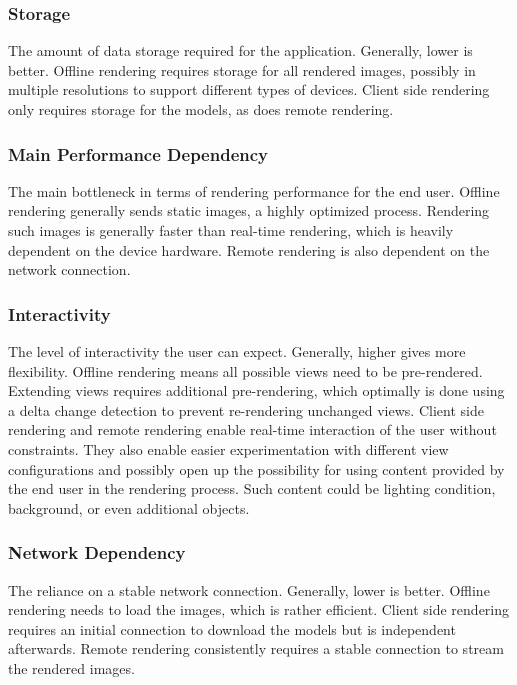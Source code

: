 \subsubsection{Storage}

The amount of data storage required for the application. Generally, lower is better. Offline rendering requires storage for all rendered images, possibly in multiple resolutions to support different types of devices. Client side rendering only requires storage for the models, as does remote rendering.

\subsubsection{Main Performance Dependency}

The main bottleneck in terms of rendering performance for the end user. Offline rendering generally sends static images, a highly optimized process. Rendering such images is generally faster than real-time rendering, which is heavily dependent on the device hardware. Remote rendering is also dependent on the network connection.

\subsubsection{Interactivity}

The level of interactivity the user can expect. Generally, higher gives more flexibility. Offline rendering means all possible views need to be pre-rendered. Extending views requires additional pre-rendering, which optimally is done using a delta change detection to prevent re-rendering unchanged views. Client side rendering and remote rendering enable real-time interaction of the user without constraints. They also enable easier experimentation with different view configurations and possibly open up the possibility for using content provided by the end user in the rendering process. Such content could be lighting condition, background, or even additional objects.

\subsubsection{Network Dependency}

The reliance on a stable network connection. Generally, lower is better. Offline rendering needs to load the images, which is rather efficient. Client side rendering requires an initial connection to download the models but is independent afterwards. Remote rendering consistently requires a stable connection to stream the rendered images.

